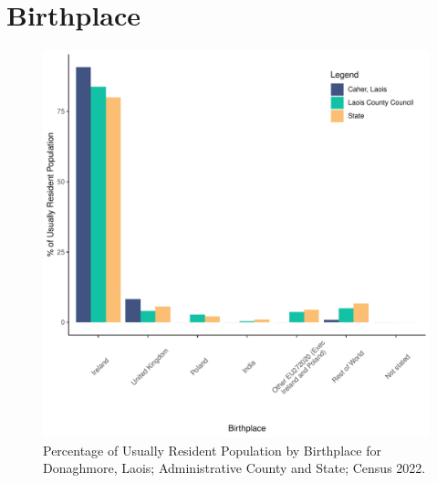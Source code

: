 \documentclass{article}
\begin{document}
\section{Birthplace}\label{sect:Birth}
\begin{figure}[H]
	\centering
	\includegraphics[width = 130mm]{../figures/BirthED.pdf}
	\caption{Percentage of Usually Resident Population by Birthplace for Donaghmore, Laois; Administrative County and State; Census 2022.}
	\label{fig:vbnv}
	\end{figure}
	
\end{document}
